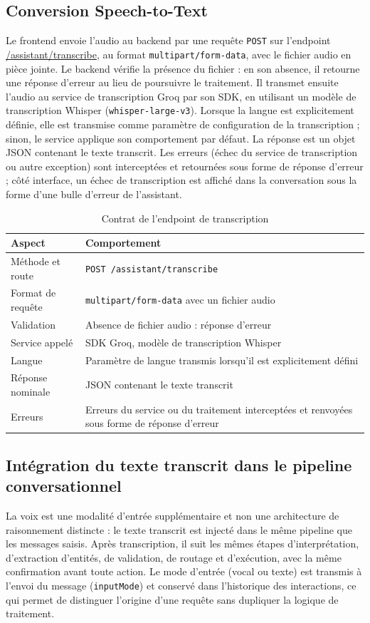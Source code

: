 \documentclass[11pt,a4paper,openany,oneside]{report}
\begin{document}
\subsection{Conversion Speech-to-Text}
Le frontend envoie l'audio au backend par une requête \texttt{POST} sur l'endpoint \url{/assistant/transcribe}, au format \texttt{multipart/form-data}, avec le fichier audio en pièce jointe. Le backend vérifie la présence du fichier : en son absence, il retourne une réponse d'erreur au lieu de poursuivre le traitement. Il transmet ensuite l'audio au service de transcription Groq par son SDK, en utilisant un modèle de transcription Whisper (\texttt{whisper-large-v3}). Lorsque la langue est explicitement définie, elle est transmise comme paramètre de configuration de la transcription ; sinon, le service applique son comportement par défaut. La réponse est un objet JSON contenant le texte transcrit. Les erreurs (échec du service de transcription ou autre exception) sont interceptées et retournées sous forme de réponse d'erreur ; côté interface, un échec de transcription est affiché dans la conversation sous la forme d'une bulle d'erreur de l'assistant.

\begin{table}[htbp]
\centering\small
\caption{Contrat de l'endpoint de transcription}\label{tab:contrat-stt}
\begin{tabularx}{\textwidth}{@{}p{4.3cm}X@{}}
\toprule
\textbf{Aspect} & \textbf{Comportement} \\
\midrule
Méthode et route & \texttt{POST /assistant/transcribe} \\
Format de requête & \texttt{multipart/form-data} avec un fichier audio \\
Validation & Absence de fichier audio : réponse d'erreur \\
Service appelé & SDK Groq, modèle de transcription Whisper \\
Langue & Paramètre de langue transmis lorsqu'il est explicitement défini \\
Réponse nominale & JSON contenant le texte transcrit \\
Erreurs & Erreurs du service ou du traitement interceptées et renvoyées sous forme de réponse d'erreur \\
\bottomrule
\end{tabularx}
\end{table}

\subsection{Intégration du texte transcrit dans le pipeline conversationnel}\label{sec:voix-integration}
La voix est une modalité d'entrée supplémentaire et non une architecture de raisonnement distincte : le texte transcrit est injecté dans le même pipeline que les messages saisis. Après transcription, il suit les mêmes étapes d'interprétation, d'extraction d'entités, de validation, de routage et d'exécution, avec la même confirmation avant toute action. Le mode d'entrée (vocal ou texte) est transmis à l'envoi du message (\texttt{inputMode}) et conservé dans l'historique des interactions, ce qui permet de distinguer l'origine d'une requête sans dupliquer la logique de traitement.
\end{document}
